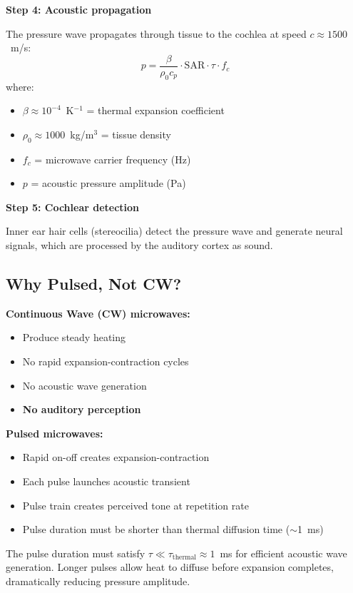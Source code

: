 \textbf{Step 4: Acoustic propagation}

The pressure wave propagates through tissue to the cochlea at speed $c \approx 1500$~m/s:
\begin{equation}
p = \frac{\beta}{\rho_0 c_p} \cdot \text{SAR} \cdot \tau \cdot f_c
\end{equation}
where:
\begin{itemize}
\item $\beta \approx 10^{-4}$~K$^{-1}$ = thermal expansion coefficient
\item $\rho_0 \approx 1000$~kg/m$^3$ = tissue density
\item $f_c$ = microwave carrier frequency (Hz)
\item $p$ = acoustic pressure amplitude (Pa)
\end{itemize}

\textbf{Step 5: Cochlear detection}

Inner ear hair cells (stereocilia) detect the pressure wave and generate neural signals, which are processed by the auditory cortex as sound.

\subsection{Why Pulsed, Not CW?}

\textbf{Continuous Wave (CW) microwaves:}
\begin{itemize}
\item Produce steady heating
\item No rapid expansion-contraction cycles
\item No acoustic wave generation
\item \textbf{No auditory perception}
\end{itemize}

\textbf{Pulsed microwaves:}
\begin{itemize}
\item Rapid on-off creates expansion-contraction
\item Each pulse launches acoustic transient
\item Pulse train creates perceived tone at repetition rate
\item Pulse duration must be shorter than thermal diffusion time ($\sim$1~ms)
\end{itemize}

\begin{warningbox}
The pulse duration must satisfy $\tau \ll \tau_{\text{thermal}} \approx 1$~ms for efficient acoustic wave generation. Longer pulses allow heat to diffuse before expansion completes, dramatically reducing pressure amplitude.
\end{warningbox}

